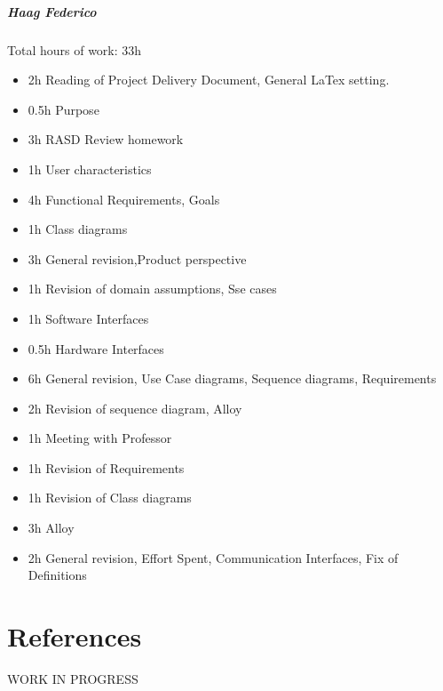 \documentclass{report}
\begin{document}
		\paragraph{Haag Federico} Total hours of work: 33h
			\begin{itemize}
				\item 2h Reading of Project Delivery Document, General LaTex setting.
				\item 0.5h Purpose
				\item 3h RASD Review homework
				\item 1h User characteristics
				\item 4h Functional Requirements, Goals
				\item 1h Class diagrams
				\item 3h General revision,Product perspective
				\item 1h Revision of domain assumptions, Sse cases
				\item 1h Software Interfaces
				\item 0.5h Hardware Interfaces
				\item 6h General revision, Use Case diagrams, Sequence diagrams, Requirements
				\item 2h Revision of sequence diagram, Alloy
				\item 1h Meeting with Professor
				\item 1h Revision of Requirements
				\item 1h Revision of Class diagrams
				\item 3h Alloy
				\item 2h General revision, Effort Spent, Communication Interfaces, Fix of Definitions
			\end{itemize}
	\chapter{References}
	\thispagestyle{fancy}
	WORK IN PROGRESS
	
\end{document}
